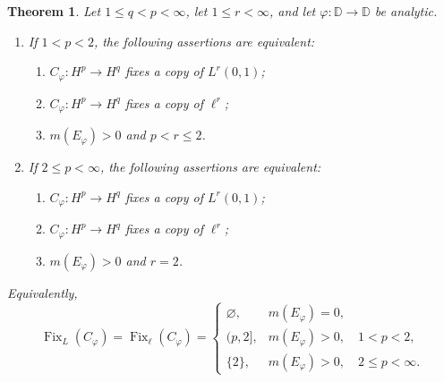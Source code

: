 \documentclass[10pt,a4paper]{amsart}
\newtheorem{theorem}{Theorem}[section]
\newcommand{\D}{\mathbb{D}}
\begin{document}
\begin{theorem}
\label{thm:q-lt-p-class}
Let \(1\le q<p<\infty\), let \(1\le r<\infty\), and let
\(\varphi:\D\to\D\) be analytic.

\begin{enumerate}[label=\textup{(\roman*)}]
\item If \(1<p<2\), the following assertions are equivalent:
\begin{enumerate}[label=\textup{(\alph*)}]
\item \(C_\varphi:H^p\to H^q\) fixes a copy of \(L^r(0,1)\);
\item \(C_\varphi:H^p\to H^q\) fixes a copy of \(\ell^r\);
\item \(m(E_\varphi)>0\) and \(p<r\le2\).
\end{enumerate}

\item If \(2\le p<\infty\), the following assertions are equivalent:
\begin{enumerate}[label=\textup{(\alph*)}]
\item \(C_\varphi:H^p\to H^q\) fixes a copy of \(L^r(0,1)\);
\item \(C_\varphi:H^p\to H^q\) fixes a copy of \(\ell^r\);
\item \(m(E_\varphi)>0\) and \(r=2\).
\end{enumerate}
\end{enumerate}

Equivalently,
\[
        \operatorname{Fix}_{L}(C_\varphi)
        =
        \operatorname{Fix}_{\ell}(C_\varphi)
        =
        \begin{cases}
        \varnothing,
                & m(E_\varphi)=0,\\[1mm]
        (p,2],
                & m(E_\varphi)>0,\quad 1<p<2,\\[1mm]
        \{2\},
                & m(E_\varphi)>0,\quad 2\le p<\infty.
        \end{cases}
\]
\end{theorem}
\end{document}
